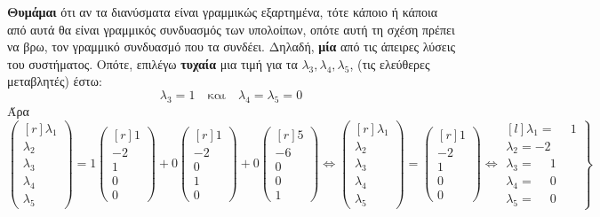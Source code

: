 \textbf{Θυμάμαι} ότι αν τα διανύσματα είναι γραμμικώς εξαρτημένα, τότε κάποιο ή 
κάποια από αυτά θα είναι γραμμικός συνδυασμός των υπολοίπων, οπότε αυτή τη σχέση 
πρέπει να βρω, τον γραμμικό συνδυασμό που τα συνδέει. Δηλαδή, \textbf{μία} από τις 
άπειρες λύσεις του συστήματος. Οπότε, επιλέγω \textbf{τυχαία} μια τιμή για τα 
$ \lambda _{3}, \lambda _{4}, \lambda _{5} $, (τις ελεύθερες μεταβλητές) έστω: 
\[
  \lambda _{3} = 1 \quad \text{και} \quad \lambda _{4} = \lambda _{5} = 0 
\] 
Άρα 
\[
  \begin{pmatrix*}[r] \lambda _{1} \\ \lambda _{2} \\ \lambda _{3} \\ \lambda _{4} \\
  \lambda _{5}  \end{pmatrix*} = 1
  \begin{pmatrix*}[r] 1 \\ -2 \\ 1 \\ 0 \\ 0  \end{pmatrix*} + 0
  \begin{pmatrix*}[r] 1 \\ -2 \\ 0 \\ 1 \\ 0  \end{pmatrix*} + 0
  \begin{pmatrix*}[r] 5 \\ -6 \\ 0 \\ 0 \\ 1  \end{pmatrix*} \Leftrightarrow 
  \begin{pmatrix*}[r] \lambda _{1} \\ \lambda _{2} \\ \lambda _{3} \\ \lambda _{4} \\
  \lambda _{5}  \end{pmatrix*} = 
  \begin{pmatrix*}[r] 1 \\ -2 \\ 1 \\ 0 \\ 0  \end{pmatrix*} \Leftrightarrow 
  \left.
    \begin{matrix*}[l]
      \lambda _{1} = \phantom{-} 1 \\
      \lambda _{2} = -2 \\
      \lambda _{3} = \phantom{-}1 \\
      \lambda _{4} = \phantom{-}0 \\
      \lambda _{5} = \phantom{-}0 
    \end{matrix*} 
  \right\} 
\] 
